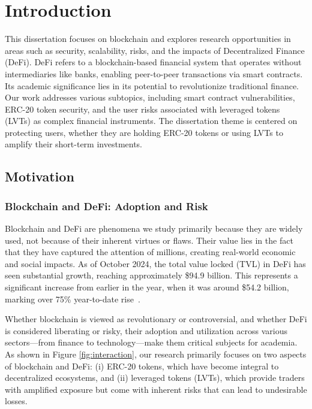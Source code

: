 
\chapter{Introduction}
This dissertation focuses on blockchain and explores research opportunities in areas such as security, scalability, risks, and the impacts of Decentralized Finance (DeFi). DeFi refers to a blockchain-based financial system that operates without intermediaries like banks, enabling peer-to-peer transactions via smart contracts. Its academic significance lies in its potential to revolutionize traditional finance. Our work addresses various subtopics, including smart contract vulnerabilities, ERC-20 token security, and the user risks associated with leveraged tokens (LVTs) as complex financial instruments. The dissertation theme is centered on protecting users, whether they are holding ERC-20 tokens or using LVTs to amplify their short-term investments.

\section{Motivation}
\subsection*{Blockchain and DeFi: Adoption and Risk}
Blockchain and DeFi are phenomena we study primarily because they are widely used, not because of their inherent virtues or flaws. Their value lies in the fact that they have captured the attention of millions, creating real-world economic and social impacts. As of October 2024, the total value locked (TVL) in DeFi has seen substantial growth, reaching approximately \$94.9 billion. This represents a significant increase from earlier in the year, when it was around \$54.2 billion, marking over 75\% year-to-date rise~\cite{coingecko2024,binance2024}.

Whether blockchain is viewed as revolutionary or controversial, and whether DeFi is considered liberating or risky, their adoption and utilization across various sectors—from finance to technology—make them critical subjects for academia. As shown in Figure \ref{fig:interaction}, our research primarily focuses on two aspects of blockchain and DeFi: (i) ERC-20 tokens, which have become integral to decentralized ecosystems, and (ii) leveraged tokens (LVTs), which provide traders with amplified exposure but come with inherent risks that can lead to undesirable losses.


